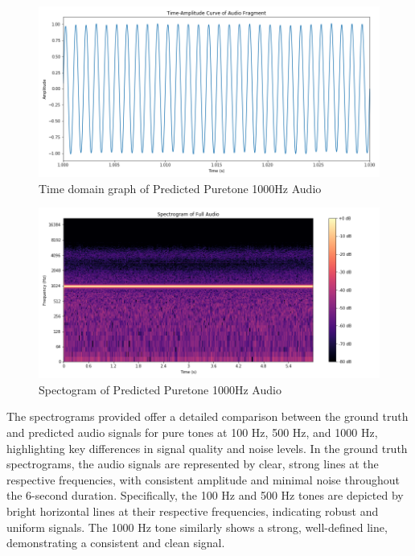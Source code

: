 \documentclass{ioereport}
\begin{document}
    \begin{figure}[H]
        \centering
        \includegraphics[width=\linewidth]{assets/audio_results/predpuretone1000hztime.png}
        \caption{Time domain graph of Predicted Puretone 1000Hz Audio}
        \label{fig:pred-pure1000-time}
    \end{figure}
    \begin{figure}[H]
        \centering
        \includegraphics[width=\linewidth]{assets/audio_results/predpuretone1000hzspec.png}
        \caption{Spectogram of Predicted Puretone 1000Hz Audio}
        \label{fig:pred-pure1000-spec}
    \end{figure}


    
    The spectrograms provided offer a detailed comparison between the ground truth and predicted audio signals for pure tones at 100 Hz, 500 Hz, and 1000 Hz, highlighting key differences in signal quality and noise levels. In the ground truth spectrograms, the audio signals are represented by clear, strong lines at the respective frequencies, with consistent amplitude and minimal noise throughout the 6-second duration. Specifically, the 100 Hz and 500 Hz tones are depicted by bright horizontal lines at their respective frequencies, indicating robust and uniform signals. The 1000 Hz tone similarly shows a strong, well-defined line, demonstrating a consistent and clean signal.
\end{document}
